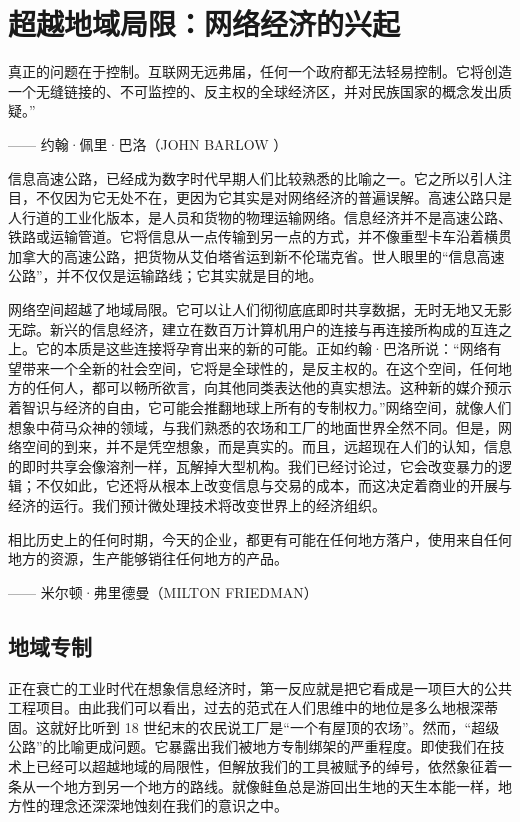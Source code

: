 \chapter[超越地域局限]{超越地域局限：网络经济的兴起} 

\begin{tcolorbox}
真正的问题在于控制。互联网无远弗届，任何一个政府都无法轻易控制。它将创造一个无缝链接的、不可监控的、反主权的全球经济区，并对民族国家的概念发出质疑。”\begin{flushright}
—— 约翰·佩里·巴洛（JOHN BARLOW ）
\end{flushright}
\end{tcolorbox}

信息高速公路，已经成为数字时代早期人们比较熟悉的比喻之一。它之所以引人注目，不仅因为它无处不在，更因为它其实是对网络经济的普遍误解。高速公路只是人行道的工业化版本，是人员和货物的物理运输网络。信息经济并不是高速公路、铁路或运输管道。它将信息从一点传输到另一点的方式，并不像重型卡车沿着横贯加拿大的高速公路，把货物从艾伯塔省运到新不伦瑞克省。世人眼里的“信息高速公路”，并不仅仅是运输路线；它其实就是目的地。

网络空间超越了地域局限。它可以让人们彻彻底底即时共享数据，无时无地又无影无踪。新兴的信息经济，建立在数百万计算机用户的连接与再连接所构成的互连之上。它的本质是这些连接将孕育出来的新的可能。正如约翰·巴洛所说：“网络有望带来一个全新的社会空间，它将是全球性的，是反主权的。在这个空间，任何地方的任何人，都可以畅所欲言，向其他同类表达他的真实想法。这种新的媒介预示着智识与经济的自由，它可能会推翻地球上所有的专制权力。”网络空间，就像人们想象中荷马众神的领域，与我们熟悉的农场和工厂的地面世界全然不同。但是，网络空间的到来，并不是凭空想象，而是真实的。而且，远超现在人们的认知，信息的即时共享会像溶剂一样，瓦解掉大型机构。我们已经讨论过，它会改变暴力的逻辑；不仅如此，它还将从根本上改变信息与交易的成本，而这决定着商业的开展与经济的运行。我们预计微处理技术将改变世界上的经济组织。

\begin{tcolorbox}
相比历史上的任何时期，今天的企业，都更有可能在任何地方落户，使用来自任何地方的资源，生产能够销往任何地方的产品。
\begin{flushright}
—— 米尔顿·弗里德曼（MILTON FRIEDMAN）
\end{flushright}
\end{tcolorbox}

\section{地域专制}
正在衰亡的工业时代在想象信息经济时，第一反应就是把它看成是一项巨大的公共工程项目。由此我们可以看出，过去的范式在人们思维中的地位是多么地根深蒂固。这就好比听到 18 世纪末的农民说工厂是“一个有屋顶的农场”。然而，“超级公路”的比喻更成问题。它暴露出我们被地方专制绑架的严重程度。即使我们在技术上已经可以超越地域的局限性，但解放我们的工具被赋予的绰号，依然象征着一条从一个地方到另一个地方的路线。就像鲑鱼总是游回出生地的天生本能一样，地方性的理念还深深地蚀刻在我们的意识之中。


